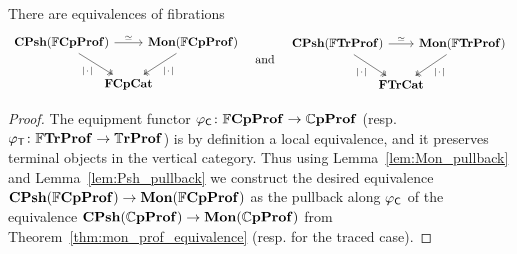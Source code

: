 \documentclass[11pt,oneside,article]{memoir}
\begin{document}
\begin{lemma}
      \label{lem:FrCompProf_Psh_Mon}
   There are equivalences of fibrations
   \begin{equation*}
      \begin{tikzcd}[column sep=-1.25em]
         \CPsh(\dFrCompProf) \ar[rr,"\equiv"] \ar[dr,two heads,"\MOb"']
            && \Mon(\dFrCompProf) \ar[dl,two heads,"\MOb"] \\
            & \FrCompCat &
      \end{tikzcd}
      \quad\tn{and}\quad
        \begin{tikzcd}[column sep=-1.25em]
         \CPsh(\dFrTrProf) \ar[rr,"\equiv"] \ar[dr,two heads,"\MOb"']
            && \Mon(\dFrTrProf) \ar[dl,two heads,"\MOb"] \\
            & \FrTrCat &
      \end{tikzcd}
   \end{equation*}
\end{lemma}
\begin{proof}
   The equipment functor $\varphi_{\mathsf{C}}\colon\mathbb{F}\mathbf{CpProf}\to\mathbb{C}\mathbf{pProf}$ (resp. $\varphi_{\mathsf{T}}\colon\mathbb{F}\mathbf{TrProf}\to\mathbb{T}\mathbf{rProf}$) is by definition a local equivalence, and it preserves terminal objects in the vertical category. Thus using Lemma~\ref{lem:Mon_pullback} and Lemma~\ref{lem:Psh_pullback} we construct the desired equivalence $\mathbf{CPsh}(\mathbb{F}\mathbf{CpProf})\to\mathbf{Mon}(\mathbb{F}\mathbf{CpProf})$ as the pullback along $\varphi_{\mathsf{C}}$ of the equivalence $\mathbf{CPsh}(\mathbb{C}\mathbf{pProf})\to\mathbf{Mon}(\mathbb{C}\mathbf{pProf})$ from Theorem~\ref{thm:mon_prof_equivalence} (resp. for the traced case).
\end{proof}
\end{document}
